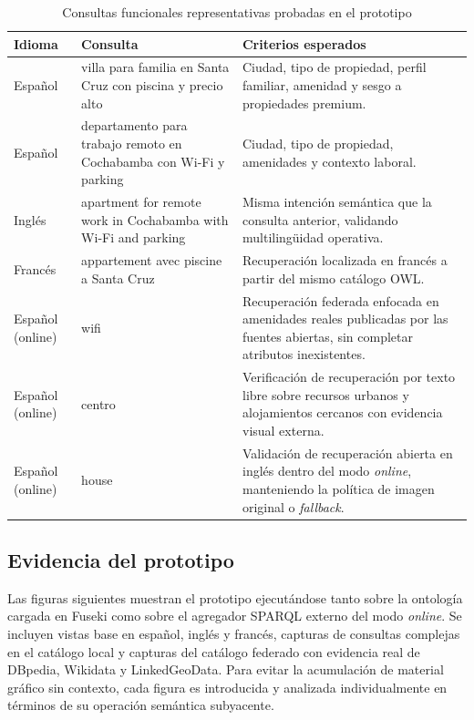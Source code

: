 \begin{table}[H]
\centering
\caption{Consultas funcionales representativas probadas en el prototipo}
\begin{tabular}{|p{2.2cm}|p{7.1cm}|p{5.2cm}|}
\hline
\textbf{Idioma} & \textbf{Consulta} & \textbf{Criterios esperados} \\
\hline
Español & villa para familia en Santa Cruz con piscina y precio alto & Ciudad, tipo de propiedad, perfil familiar, amenidad y sesgo a propiedades premium. \\
\hline
Español & departamento para trabajo remoto en Cochabamba con Wi-Fi y parking & Ciudad, tipo de propiedad, amenidades y contexto laboral. \\
\hline
Inglés & apartment for remote work in Cochabamba with Wi-Fi and parking & Misma intención semántica que la consulta anterior, validando multilingüidad operativa. \\
\hline
Francés & appartement avec piscine a Santa Cruz & Recuperación localizada en francés a partir del mismo catálogo OWL. \\
\hline
Español (online) & wifi & Recuperación federada enfocada en amenidades reales publicadas por las fuentes abiertas, sin completar atributos inexistentes. \\
\hline
Español (online) & centro & Verificación de recuperación por texto libre sobre recursos urbanos y alojamientos cercanos con evidencia visual externa. \\
\hline
Español (online) & house & Validación de recuperación abierta en inglés dentro del modo \textit{online}, manteniendo la política de imagen original o \textit{fallback}. \\
\hline
\end{tabular}
\end{table}

\subsection{Evidencia del prototipo}

Las figuras siguientes muestran el prototipo ejecutándose tanto sobre la ontología cargada en Fuseki como sobre el agregador SPARQL externo del modo \textit{online}. Se incluyen vistas base en español, inglés y francés, capturas de consultas complejas en el catálogo local y capturas del catálogo federado con evidencia real de DBpedia, Wikidata y LinkedGeoData. Para evitar la acumulación de material gráfico sin contexto, cada figura es introducida y analizada individualmente en términos de su operación semántica subyacente.


